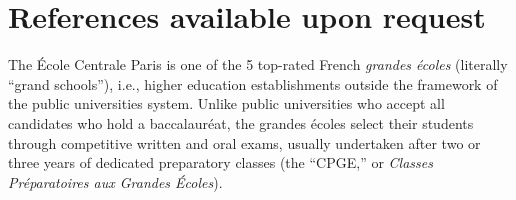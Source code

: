 \documentclass[11pt,a4paper]{moderncv}
\begin{document}


\section{References available upon request}

\flushleft
\footnotemark[1] \small{The \'{E}cole Centrale Paris is one of the 5 top-rated French \textit{grandes écoles} (literally ``grand schools''), i.e., higher education establishments outside the framework of the public universities system. Unlike public universities who accept all candidates who hold a baccalauréat, the grandes écoles select their students through competitive written and oral exams, usually undertaken after two or three years of dedicated preparatory classes (the ``CPGE,'' or \textit{Classes Préparatoires aux Grandes Écoles})}.

%
\end{document}

